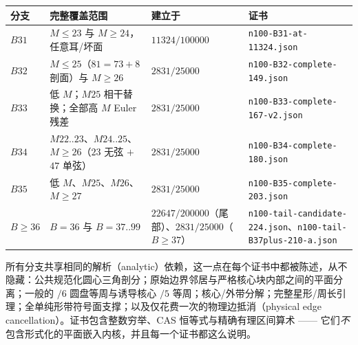 \begin{center}
\footnotesize
\begin{tabular}{@{}>{\raggedright\arraybackslash}p{}>{\raggedright\arraybackslash}p{}>{\raggedright\arraybackslash}p{}>{\raggedright\arraybackslash}p{}@{}}
\toprule
分支 & 完整覆盖范围 & 建立于 & 证书 \\
\midrule
$B31$ & $M\le23$ 与 $M\ge24$，任意耳/坏面 &
$11324/100000$ & \texttt{n100-\allowbreak{}B31-\allowbreak{}at-\allowbreak{}11324.json} \\
$B32$ & $M\le25$（$81=73+8$ 剖面）与 $M\ge26$ &
$2831/25000$ & \texttt{n100-\allowbreak{}B32-\allowbreak{}complete-\allowbreak{}149.json} \\
$B33$ & 低 $M$；$M25$ 相干替换；全部高 $M$ Euler 残差 &
$2831/25000$ & \texttt{n100-\allowbreak{}B33-\allowbreak{}complete-\allowbreak{}167-\allowbreak{}v2.json} \\
$B34$ & $M22..23$、$M24..25$、$M\ge26$（$23$ 无弦 $+$ $47$ 单弦） &
$2831/25000$ & \texttt{n100-\allowbreak{}B34-\allowbreak{}complete-\allowbreak{}180.json} \\
$B35$ & 低 $M$、$M25$、$M26$、$M\ge27$ &
$2831/25000$ & \texttt{n100-\allowbreak{}B35-\allowbreak{}complete-\allowbreak{}203.json} \\
$B\ge36$ & $B=36$ 与 $B=37..99$ &
$22647/200000$（尾部）、$2831/25000$（$B\ge37$） &
\texttt{n100-\allowbreak{}tail-\allowbreak{}candidate-\allowbreak{}224.json}、\texttt{n100-\allowbreak{}tail-\allowbreak{}B37plus-\allowbreak{}210-\allowbreak{}a.json} \\
\bottomrule
\end{tabular}
\end{center}

所有分支共享相同的解析（analytic）依赖，这一点在每个证书中都被陈述，从不隐藏：公共规范化圆心三角剖分；原始边界邻居与严格核心块内部之间的平面分离；一般的 $/6$ 圆盘等周与诱导核心 $/5$ 等周；核心/外带分解；完整星形/周长引理；全单纯形带符号面支撑；以及仅花费一次的物理边抵消（physical edge cancellation）。证书包含整数穷举、CAS 恒等式与精确有理区间算术 —— 它们\emph{不}包含形式化的平面嵌入内核，并且每一个证书都这么说明。

